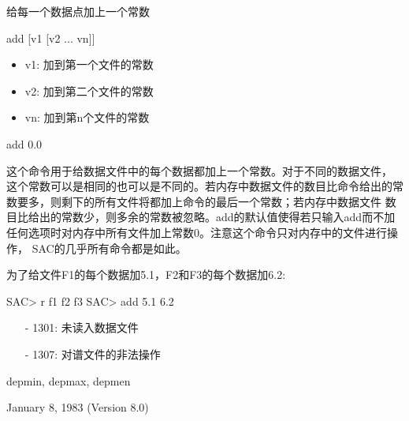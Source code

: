 \label{cmd:add}

给每一个数据点加上一个常数

\begin{SACSTX}
add [v1 [v2 ... vn]]
\end{SACSTX}

\begin{itemize}
\item v1:  加到第一个文件的常数
\item v2:  加到第二个文件的常数
\item vn:  加到第n个文件的常数
\end{itemize}

\begin{SACDFT}
add 0.0
\end{SACDFT}

这个命令用于给数据文件中的每个数据都加上一个常数。对于不同的数据文件，
这个常数可以是相同的也可以是不同的。若内存中数据文件的数目比命令给出的常
数要多，则剩下的所有文件将都加上命令的最后一个常数；若内存中数据文件
数目比给出的常数少，则多余的常数被忽略。add的默认值使得若只输入add而不加
任何选项时对内存中所有文件加上常数0。注意这个命令只对内存中的文件进行操作，
SAC的几乎所有命令都是如此。

为了给文件F1的每个数据加5.1，F2和F3的每个数据加6.2:
\begin{SACCode}
SAC> r f1 f2 f3
SAC> add 5.1 6.2
\end{SACCode}

\begin{itemize}
\item[-]1301: 未读入数据文件
\item[-]1307: 对谱文件的非法操作
\end{itemize}

depmin, depmax, depmen

January 8, 1983 (Version 8.0)
